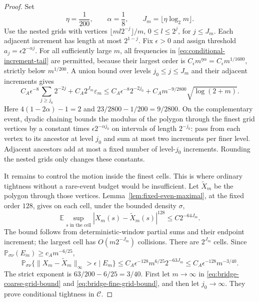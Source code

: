 \begin{proof}
Set
\begin{equation}\label{eq:bridge-tightness-scales}
 \eta=\frac1{200},\qquad \alpha=\frac18,\qquad
 J_m=\lfloor\eta\log_2m\rfloor.
\end{equation}
Use the nested grids with vertices
$\lfloor ml2^{-j}\rfloor/m$, $0\le l\le2^j$, for
$j\le J_m$. Each adjacent increment has length at most $2^{1-j}$.
Fix $\epsilon>0$ and assign threshold
$a_j=\epsilon2^{-\alpha j}$. For all sufficiently large $m$, all
frequencies in \eqref{eq:conditional-increment-tail} are permitted,
because their largest order is
$C_\epsilon m^{\eta\alpha}=C_\epsilon m^{1/1600}$,
strictly below $m^{1/200}$. A union bound over levels
$j_0\le j\le J_m$ and their adjacent increments gives
\begin{equation}\label{eq:bridge-coarse-grid-bound}
 C_A\epsilon^{-8}\sum_{j\ge j_0}2^{-2j}
       +C_A2^{J_m}\varepsilon_m
 \le C_A\epsilon^{-8}2^{-2j_0}
       +C_A m^{-9/2800}\sqrt{\log(2+m)}.
\end{equation}
Here $4(1-2\alpha)-1=2$ and $23/2800-1/200=9/2800$.
On the complementary event, dyadic chaining bounds the modulus of
the polygon through the finest grid vertices by a constant times
$\epsilon2^{-\alpha j_0}$ on intervals of length $2^{-j_0}$:
pass from each vertex to its ancestor at level $j_0$ and sum at most
two increments per finer level. Adjacent ancestors add at most a
fixed number of level-$j_0$ increments. Rounding the nested grids
only changes these constants.

It remains to control the motion inside the finest cells. This is
where ordinary tightness without a rare-event budget would be
insufficient. Let $\widetilde X_m$ be the polygon through those
vertices. Lemma~\ref{lem:fixed-even-maximal}, at the fixed order
$128$, gives on each cell, under the bounded density $\sigma$,
\[
 \mathbb E\sup_{s\text{ in the cell}}
          |X_m(s)-\widetilde X_m(s)|^{128}
                                     \le C2^{-64J_m}.
\]
The bound follows from deterministic-window partial sums and their
endpoint increment; the largest cell has $O(m2^{-J_m})$ collisions.
There are $2^{J_m}$ cells. Since
$\mathbb P_{\sigma\nu}(E_m)\ge c_A m^{-6/25}$,
\begin{equation}\label{eq:bridge-fine-grid-bound}
 \mathbb P_{\sigma\nu}
 \{\|X_m-\widetilde X_m\|_\infty>\epsilon\mid E_m\}
 \le C_A\epsilon^{-128}m^{6/25}2^{-63J_m}
 \le C_A\epsilon^{-128}m^{-3/40}.
\end{equation}
The strict exponent is $63/200-6/25=3/40$.
First let $m\to\infty$ in \eqref{eq:bridge-coarse-grid-bound}
and \eqref{eq:bridge-fine-grid-bound}, and then let $j_0\to\infty$.
They prove conditional tightness in $\mathcal C$.


\end{proof}
